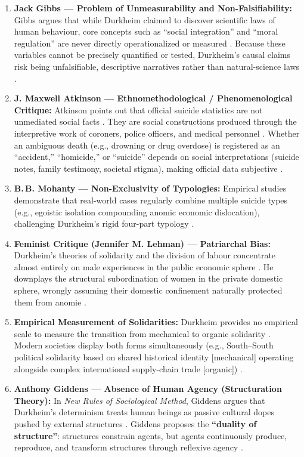 \begin{enumerate}
    \item \textbf{Jack Gibbs --- Problem of Unmeasurability and Non-Falsifiability:}
    Gibbs argues that while Durkheim claimed to discover scientific laws of human behaviour, core concepts such as ``social integration'' and ``moral regulation'' are never directly operationalized or measured . Because these variables cannot be precisely quantified or tested, Durkheim's causal claims risk being unfalsifiable, descriptive narratives rather than natural-science laws .
    
    \item \textbf{J. Maxwell Atkinson --- Ethnomethodological / Phenomenological Critique:}
    Atkinson points out that official suicide statistics are not unmediated social facts . They are social constructions produced through the interpretive work of coroners, police officers, and medical personnel . Whether an ambiguous death (e.g., drowning or drug overdose) is registered as an ``accident,'' ``homicide,'' or ``suicide'' depends on social interpretations (suicide notes, family testimony, societal stigma), making official data subjective .
    
    \item \textbf{B.\,B. Mohanty --- Non-Exclusivity of Typologies:}
    Empirical studies demonstrate that real-world cases regularly combine multiple suicide types (e.g., egoistic isolation compounding anomic economic dislocation), challenging Durkheim's rigid four-part typology .
    
    \item \textbf{Feminist Critique (Jennifer M. Lehman) --- Patriarchal Bias:}
    Durkheim's theories of solidarity and the division of labour concentrate almost entirely on male experiences in the public economic sphere . He downplays the structural subordination of women in the private domestic sphere, wrongly assuming their domestic confinement naturally protected them from anomie .
    
    \item \textbf{Empirical Measurement of Solidarities:}
    Durkheim provides no empirical scale to measure the transition from mechanical to organic solidarity . Modern societies display both forms simultaneously (e.g., South--South political solidarity based on shared historical identity [mechanical] operating alongside complex international supply-chain trade [organic]) .
    
    \item \textbf{Anthony Giddens --- Absence of Human Agency (Structuration Theory):}
    In \textit{New Rules of Sociological Method}, Giddens argues that Durkheim's determinism treats human beings as passive cultural dopes pushed by external structures . Giddens proposes the \textbf{``duality of structure''}: structures constrain agents, but agents continuously produce, reproduce, and transform structures through reflexive agency .
\end{enumerate}

